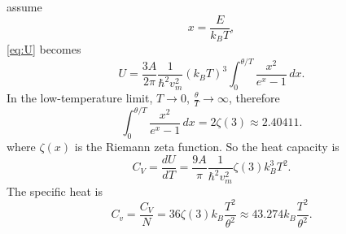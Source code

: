 \documentclass[12pt]{article}
\begin{document}
assume
\begin{equation}
	x = \frac{ E }{ k_B T },
\end{equation}
\eqref{eq:U} becomes
\begin{equation}
	U = \frac{ 3 A }{ 2 \pi } \frac{ 1 }{ \hbar^2 v_m^2 } (k_B T)^3 \int_{0}^{\theta / T} \frac{ x^2 }{ e^x - 1 } \, dx.
\end{equation}
In the low-temperature limit, $T \rightarrow 0$, $\frac{\theta}{T} \rightarrow \infty$, therefore
\begin{equation}
	\int_{0}^{\theta / T} \frac{ x^2 }{ e^x - 1 } \, dx = 2 \zeta(3) \approx 2.40411.
\end{equation}
where $\zeta(x)$ is the Riemann zeta function.
So the heat capacity is
\begin{equation}
	C_V = \frac{ dU }{ dT } = \frac{ 9 A }{ \pi } \frac{ 1 }{ \hbar^2 v_m^2 } \zeta(3) k_B^3 T^2.
\end{equation}
The specific heat is
\begin{equation}
	C_v = \frac{ C_V }{ N } = 36 \zeta(3) k_B \frac{ T^2 }{ \theta^2 } \approx 43.274 k_B \frac{ T^2 }{ \theta^2 }.
\end{equation}





\end{document}
